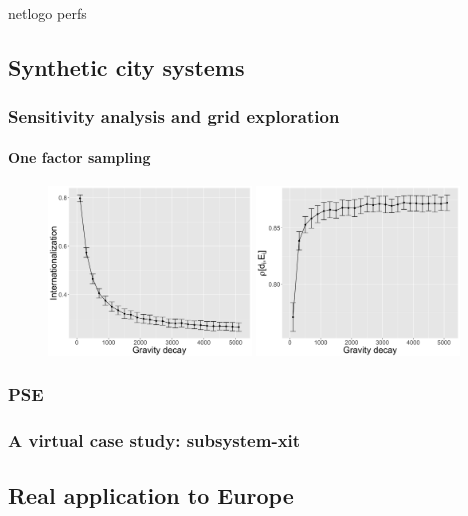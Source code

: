 \documentclass{article}
\begin{document}
\cite{railsback2017improving} netlogo perfs 

\subsection{Synthetic city systems}

\subsubsection{Sensitivity analysis and grid exploration}

\paragraph{One factor sampling}


\begin{figure}
	\includegraphics[width=0.48\textwidth]{figures/internationalization-gravityDecay_errorbars.png}
    \includegraphics[width=0.48\textwidth]{figures/rhoDegreeSize-gravityDecay_errorbars.png}\\
    
\end{figure}



\subsubsection{PSE}


\subsubsection{A virtual case study: subsystem-xit}



\subsection{Real application to Europe}







\end{document}
